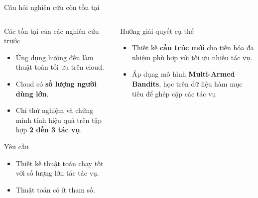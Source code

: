 \begin{frame}{Câu hỏi nghiên cứu còn tồn tại}
    \begin{columns}
        \begin{column}{0.45\textwidth}
            \begin{block}{Các tồn tại của các nghiên cứu trước}
                \begin{itemize}
                    \item Ứng dụng hướng đến làm thuật toán tối ưu trên cloud.
                    \item Cloud có \textbf{số lượng người dùng lớn}.
                    \item Chỉ thử nghiệm và chứng minh tính hiệu quả trên tập hợp \textbf{2 đến 3 tác vụ}.
                \end{itemize}
            \end{block}
            \begin{block}{Yêu cầu}
                \begin{itemize}
                    \item Thiết kế thuật toán chạy tốt với số lượng lớn tác tác vụ.
                    \item Thuật toán có ít tham số.
                \end{itemize}
            \end{block}
        \end{column}
        \begin{column}{0.45\textwidth}
            \begin{exampleblock}{Hướng giải quyết cụ thể}
                \begin{itemize}
                    \item Thiết kế \textbf{cấu trúc mới} cho tiến hóa đa nhiệm phù hợp với tối ưu nhiều tác vụ.
                    \item Áp dụng mô hình \textbf{Multi-Armed Bandits}, học trên dữ liệu hàm mục tiêu để ghép cặp các tác vụ
                \end{itemize}
            \end{exampleblock}
        \end{column}
    \end{columns}
\end{frame}